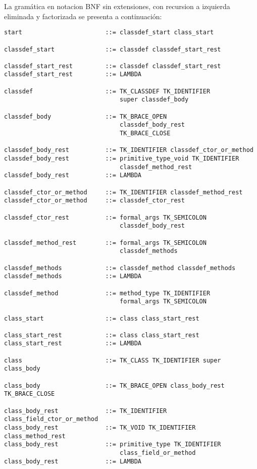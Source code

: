 \documentclass [a4paper,titlepage]{report}
\begin{document}
La gramática en notacion BNF sin extensiones, con recursion a izquierda
eliminada y factorizada se presenta a continuación:

\begin{verbatim}
start                       ::= classdef_start class_start

classdef_start              ::= classdef classdef_start_rest

classdef_start_rest         ::= classdef classdef_start_rest
classdef_start_rest         ::= LAMBDA

classdef                    ::= TK_CLASSDEF TK_IDENTIFIER 
                                super classdef_body

classdef_body               ::= TK_BRACE_OPEN 
                                classdef_body_rest 
                                TK_BRACE_CLOSE

classdef_body_rest          ::= TK_IDENTIFIER classdef_ctor_or_method
classdef_body_rest          ::= primitive_type_void TK_IDENTIFIER 
                                classdef_method_rest
classdef_body_rest          ::= LAMBDA

classdef_ctor_or_method     ::= TK_IDENTIFIER classdef_method_rest
classdef_ctor_or_method     ::= classdef_ctor_rest

classdef_ctor_rest          ::= formal_args TK_SEMICOLON 
                                classdef_body_rest

classdef_method_rest        ::= formal_args TK_SEMICOLON 
                                classdef_methods

classdef_methods            ::= classdef_method classdef_methods
classdef_methods            ::= LAMBDA

classdef_method             ::= method_type TK_IDENTIFIER 
                                formal_args TK_SEMICOLON

class_start                 ::= class class_start_rest

class_start_rest            ::= class class_start_rest    
class_start_rest            ::= LAMBDA

class                       ::= TK_CLASS TK_IDENTIFIER super class_body

class_body                  ::= TK_BRACE_OPEN class_body_rest TK_BRACE_CLOSE

class_body_rest             ::= TK_IDENTIFIER class_field_ctor_or_method
class_body_rest             ::= TK_VOID TK_IDENTIFIER class_method_rest
class_body_rest             ::= primitive_type TK_IDENTIFIER 
                                class_field_or_method
class_body_rest             ::= LAMBDA


\end{verbatim}
\end{document}
